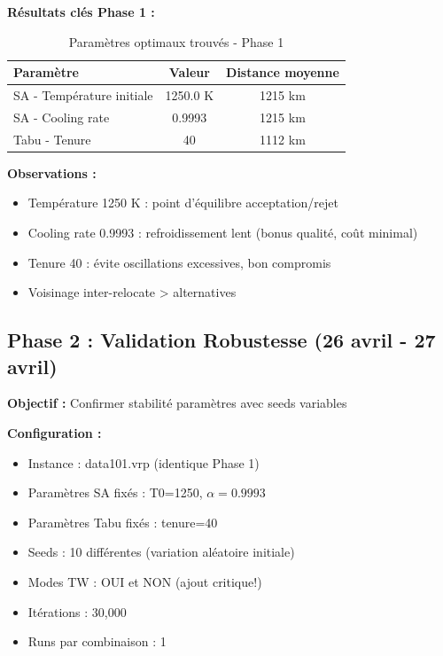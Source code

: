 \documentclass[12pt,a4paper,twoside]{report}
\begin{document}
\textbf{Résultats clés Phase 1 :}

\begin{table}[H]
    \centering
    \caption{Paramètres optimaux trouvés - Phase 1}
    \begin{tabular}{|l|c|c|}
        \hline
        \textbf{Paramètre}        & \textbf{Valeur} & \textbf{Distance moyenne} \\
        \hline
        SA - Température initiale & 1250.0 K        & 1215 km                   \\
        SA - Cooling rate         & 0.9993          & 1215 km                   \\
        Tabu - Tenure             & 40              & 1112 km                   \\
        \hline
    \end{tabular}
\end{table}

\textbf{Observations :}
\begin{itemize}
    \item Température 1250 K : point d'équilibre acceptation/rejet
    \item Cooling rate 0.9993 : refroidissement lent (bonus qualité, coût minimal)
    \item Tenure 40 : évite oscillations excessives, bon compromis
    \item Voisinage inter-relocate > alternatives
\end{itemize}

\subsection{Phase 2 : Validation Robustesse (26 avril - 27 avril)}

\textbf{Objectif :} Confirmer stabilité paramètres avec seeds variables

\textbf{Configuration :}
\begin{itemize}
    \item Instance : data101.vrp (identique Phase 1)
    \item Paramètres SA fixés : T0=1250, $\alpha=0.9993$
    \item Paramètres Tabu fixés : tenure=40
    \item Seeds : 10 différentes (variation aléatoire initiale)
    \item Modes TW : OUI et NON (ajout critique!)
    \item Itérations : 30,000
    \item Runs par combinaison : 1
\end{itemize}
\end{document}
